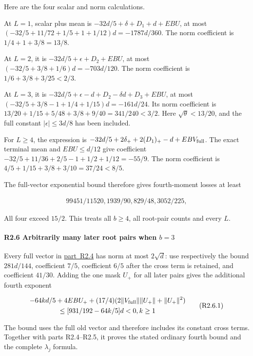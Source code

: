 Here are the four scalar and norm calculations.

At \(L=1\), scalar plus mean is \(-32d/5+\delta+D_1+d+EBU\), at most \((-32/5+11/72+1/5+1+1/12)d=-1787d/360\). The norm coefficient is \(1/4+1+3/8=13/8\).

At \(L=2\), it is \(-32d/5+\epsilon+D_2+EBU\), at most \((-32/5+3/8+1/6)d=-703d/120\). The norm coefficient is \(1/6+3/8+3/25<2/3\).

At \(L=3\), it is \(-32d/5+\epsilon-d+D_2-\delta d+D_3+EBU\), at most \((-32/5+3/8-1+1/4+1/15)d=-161d/24\). Its norm coefficient is \(13/20+1/15+5/48+3/8+9/40=341/240<3/2\). Here \(\sqrt\theta<13/20\), and the full constant \(|\epsilon|\le3d/8\) has been included.

For \(L\ge4\), the expression is \(-32d/5+2\delta_++2(D_1)_+-d+EBV_{\rm full}\). The exact terminal mean and \(EBU\le d/12\) give coefficient \(-32/5+11/36+2/5-1+1/2+1/12=-55/9\). The norm coefficient is \(4/5+1/15+3/8+3/10=37/24<8/5\).

The full-vector exponential bound therefore gives fourth-moment losses at least

\[
\begin{gathered}
99451/11520,1939/90,829/48,3052/225,
\end{gathered}
\]

All four exceed \(15/2\). This treats all \(b\ge4\), all root-pair counts and every \(L\).

\paragraph{R2.6 Arbitrarily many later root pairs when \(b=3\)}\label{part:R2.6}

Every full vector in \mbox{\hyperref[part:R2.4]{part R2.4}} has norm at most \(2\sqrt d\): use respectively the bound \(281d/144\), coefficient \(7/5\), coefficient \(6/5\) after the cross term is retained, and coefficient \(41/30\). Adding the one mask \(U_+\) for all later pairs gives the additional fourth exponent

\[
\begin{gathered}
-64kd/5+4EBU_++(17/4)(2\|V_{\rm full}\|\|U_+\|+\|U_+\|^2)\\
\le [931/192-64k/5]d<0,k\ge 1 
\end{gathered}\tag{R2.6.1}
\]

The bound uses the full old vector and therefore includes its constant cross terms.  Together with parts R2.4--R2.5, it proves the stated ordinary fourth bound and the complete \(\lambda_j\) formula.

